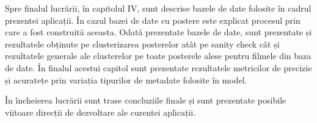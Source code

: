 Spre finalul lucrării, în capitolul IV, sunt descrise bazele de date folosite în cadrul prezentei aplicații. În cazul bazei de date cu postere este explicat procesul prin care a fost construită aceasta. Odată prezentate bazele de date, sunt prezentate și rezultatele obținute pe clusterizarea posterelor atât pe sanity check cât și rezultatele generale ale clusterelor pe toate posterele alese pentru filmele din baza de date. În finalul acestui capitol sunt prezentate rezultatele metricilor de precizie și acuratețe prin variația tipurilor de metadate folosite în model.

În încheierea lucrării sunt trase concluziile finale și sunt prezentate posibile viitoare
direcții de dezvoltare ale curentei aplicații.